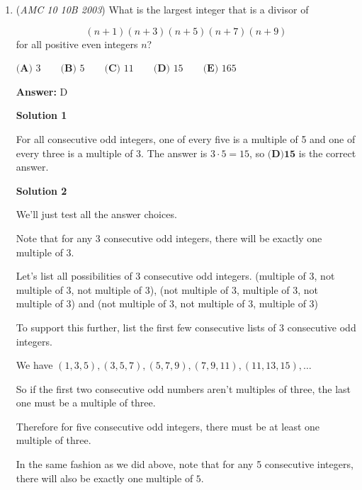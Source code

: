 \begin{enumerate}
 
 \begin{align*}\pi r^3&=\pi r^2h/3\\ r&=h/3\\ 3&=h/r\end{align*}


 Then the ratio of the cone's height to its radius is $h:r=\boxed{\textbf{(B)}\ 3:1}$



	\item (\textit{AMC 10 10B 2003}) What is the largest integer that is a divisor of

 \[(n+1)(n+3)(n+5)(n+7)(n+9)\]
for all positive even integers $n$?


 $\textbf{(A) } 3 \qquad\textbf{(B) } 5 \qquad\textbf{(C) } 11 \qquad\textbf{(D) } 15 \qquad\textbf{(E) } 165$

 \textbf{Answer: }D



\textbf{Solution 1}

For all consecutive odd integers, one of every five is a multiple of 5 and one of every three is a multiple of 3. The answer is $3 \cdot 5 = 15$, so  ${\boxed{\textbf{(D)15}}}$ is the correct answer.

 



\textbf{Solution 2}

We'll just test all the answer choices.

 Note that for any 3 consecutive odd integers, there will be exactly one multiple of $3.$

 Let's list all possibilities of 3 consecutive odd integers. (multiple of 3, not multiple of 3, not multiple of 3), (not multiple of 3, multiple of 3, not multiple of 3) and (not multiple of 3, not multiple of 3, multiple of 3)

 To support this further, list the first few  consecutive lists of 3 consecutive odd integers.

 We have $(1, 3, 5), (3, 5, 7), (5, 7, 9), (7, 9, 11), (11, 13, 15), \ldots$

 So if the first two consecutive odd numbers aren't multiples of three, the last one must be a multiple of three.

 Therefore for five consecutive odd integers, there must be at least one multiple of three.

 In the same fashion as we did above, note that for any 5 consecutive integers, there will also be exactly one multiple of $5.$


\end{enumerate}
